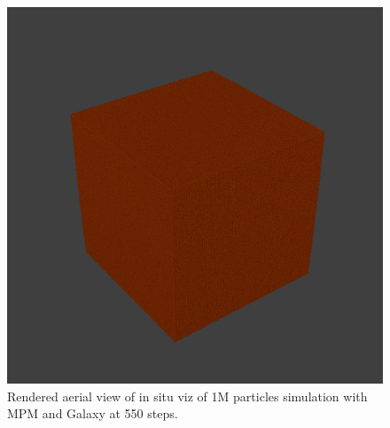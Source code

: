 \documentclass{vgtc}
\begin{document}
\begin{figure}
    \centering
    \includegraphics[width=\linewidth]{figs/1mil_550.png}
    \caption{Rendered aerial view of in situ viz of 1M particles simulation with MPM and Galaxy at 550 steps.}
    \label{fig:1M}
\end{figure}
\end{document}
